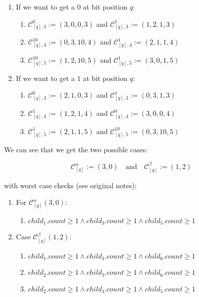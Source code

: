 \documentclass{article}
\newtheorem*{theorem A}{Theorem A}
\newtheorem*{theorem B}{N\"olker's Theorem}
\theoremstyle{remark}
\theoremstyle{remark}
\begin{document}
\begin{enumerate}
    \item If we want to get a $0$ at bit position $q$:
        \begin{enumerate}
            \item $\mathcal{C}^{0}_{[q],3} := \left(3, 0, 0, 3\right)$ and $\mathcal{C}^{1}_{[q],3} := \left(1, 2, 1, 3\right)$
            \item $\mathcal{C}^{10}_{[q],4} := \left(0, 3, 10, 4\right)$ and $\mathcal{C}^{1}_{[q],4} := \left(2, 1, 1, 4\right)$
            \item $\mathcal{C}^{10}_{[q],5} := \left(1, 2, 10, 5\right)$ and $\mathcal{C}^{1}_{[q],5} := \left(3, 0, 1, 5\right)$
        \end{enumerate}

    \item If we want to get a $1$ at bit position $q$:
        \begin{enumerate}
            \item $\mathcal{C}^{0}_{[q],3} := \left(2, 1, 0, 3\right)$ and $\mathcal{C}^{1}_{[q],3} := \left(0, 3, 1, 3\right)$
            \item $\mathcal{C}^{1}_{[q],4} := \left(1, 2, 1, 4\right)$ and $\mathcal{C}^{0}_{[q],4} := \left(3, 0, 0, 4\right)$
            \item $\mathcal{C}^{1}_{[q],5} := \left(2, 1, 1, 5\right)$ and $\mathcal{C}^{10}_{[q],5} := \left(0, 3, 10, 5\right)$
        \end{enumerate}
\label{enum:background_Cpairs}
\end{enumerate} 

We can see that we get the two possible cases:

\begin{equation}
    \mathcal{C}^{\alpha}_{[q]} := \left(3,0\right) \quad \mathrm{and} \quad \mathcal{C}^{\beta}_{[q]} := \left(1,2\right)
\label{eq:ruleCase_01}
\end{equation}

with worst case checks (see original notes):

\begin{enumerate}
    \item For $\mathcal{C}^{\alpha}_{[q]}\left(3,0\right)$:
        \begin{enumerate}
            \item $child_{1}.count \geq 1 \wedge child_{3}.count \geq 1 \wedge child_{5}.count \geq 1$
        \end{enumerate}


  \item Case $\mathcal{C}^{\beta}_{[q]}\left(1,2\right)$:
        \begin{enumerate}
            \item $child_{1}.count \geq 1 \wedge child_{4}.count \geq 1 \wedge child_{6}.count \geq 1$
            \item $child_{2}.count \geq 1 \wedge child_{3}.count \geq 1 \wedge child_{6}.count \geq 1$
            \item $child_{2}.count \geq 1 \wedge child_{4}.count \geq 1 \wedge child_{5}.count \geq 1$
        \end{enumerate}
\end{enumerate}
\end{document}
